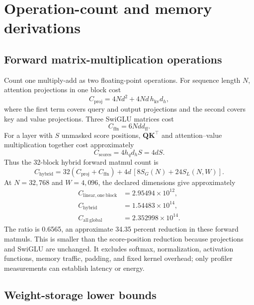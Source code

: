 \documentclass[10pt,letterpaper]{article}
\newcommand{\1}{\mathbb{1}}
\newcommand{\mat}[1]{\bm{#1}}
\begin{document}
\section{Operation-count and memory derivations}

\subsection{Forward matrix-multiplication operations}

Count one multiply-add as two floating-point operations.  For sequence length $N$, attention
projections in one block cost
\begin{equation}
  C_{\mathrm{proj}}
  =4Nd^2+4Nd\,h_{\mathrm{kv}}d_h,
  \label{eq:projection-flops}
\end{equation}
where the first term covers query and output projections and the second covers key and value
projections.  Three SwiGLU matrices cost
\begin{equation}
  C_{\mathrm{ffn}}=6Ndd_{\mathrm{ff}}.
  \label{eq:ffn-flops}
\end{equation}
For a layer with $S$ unmasked score positions, $\mat Q\mat K^\top$ and attention--value multiplication
together cost approximately
\begin{equation}
  C_{\mathrm{scores}}=4h_qd_hS=4dS.
  \label{eq:score-flops}
\end{equation}
Thus the 32-block hybrid forward matmul count is
\begin{equation}
  C_{\mathrm{hybrid}}
  =32(C_{\mathrm{proj}}+C_{\mathrm{ffn}})
   +4d\,[8S_G(N)+24S_L(N,W)].
  \label{eq:hybrid-flops}
\end{equation}
At $N=32{,}768$ and $W=4{,}096$, the declared dimensions give approximately
\begin{align}
  C_{\mathrm{linear,one\ block}}&=2.95494\times10^{12},\\
  C_{\mathrm{hybrid}}&=1.54483\times10^{14},\\
  C_{\mathrm{all\ global}}&=2.352998\times10^{14}.
\end{align}
The ratio is 0.6565, an approximate 34.35 percent reduction in these forward matmuls.  This is smaller
than the score-position reduction because projections and SwiGLU are unchanged.  It excludes
softmax, normalization, activation functions, memory traffic, padding, and fixed kernel overhead;
only profiler measurements can establish latency or energy.

\subsection{Weight-storage lower bounds}
\end{document}
